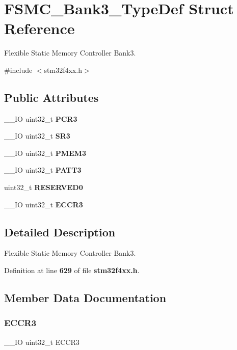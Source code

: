 \section{F\+S\+M\+C\+\_\+\+Bank3\+\_\+\+Type\+Def Struct Reference}
\label{structFSMC__Bank3__TypeDef}


Flexible Static Memory Controller Bank3.  




{\ttfamily \#include $<$stm32f4xx.\+h$>$}

\subsection*{Public Attributes}
\begin{DoxyCompactItemize}
\item 
\+\_\+\+\_\+\+IO uint32\+\_\+t \textbf{ P\+C\+R3}
\item 
\+\_\+\+\_\+\+IO uint32\+\_\+t \textbf{ S\+R3}
\item 
\+\_\+\+\_\+\+IO uint32\+\_\+t \textbf{ P\+M\+E\+M3}
\item 
\+\_\+\+\_\+\+IO uint32\+\_\+t \textbf{ P\+A\+T\+T3}
\item 
uint32\+\_\+t \textbf{ R\+E\+S\+E\+R\+V\+E\+D0}
\item 
\+\_\+\+\_\+\+IO uint32\+\_\+t \textbf{ E\+C\+C\+R3}
\end{DoxyCompactItemize}


\subsection{Detailed Description}
Flexible Static Memory Controller Bank3. 

Definition at line \textbf{ 629} of file \textbf{ stm32f4xx.\+h}.



\subsection{Member Data Documentation}
\mbox{\label{structFSMC__Bank3__TypeDef_a6062be7dc144c07e01c303cb49d69ce2}} 
\subsubsection{E\+C\+C\+R3}
{\footnotesize\ttfamily \+\_\+\+\_\+\+IO uint32\+\_\+t E\+C\+C\+R3}


